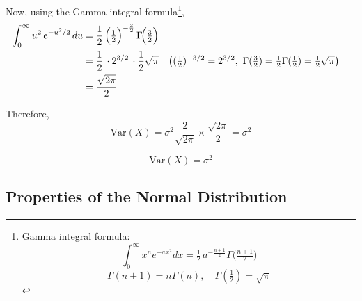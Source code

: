 \documentclass[twoside]{book}
\begin{document}
\begin{itemize}
    Now, using the Gamma integral formula\footnote{Gamma integral formula:
    $$\int_{0}^{\infty} x^n e^{-a x^2}dx
         = \tfrac12\,a^{-\frac{n+1}{2}}\Gamma\!\bigl(\tfrac{n+1}{2}\bigr)$$
         $$\Gamma(n+1) = n\Gamma(n), \quad \Gamma(\tfrac12) = \sqrt{\pi}$$
         },
    \begin{align*}
    \int_{0}^{\infty} u^2\,e^{-u^2/2}\,du
    &= \frac{1}{2}\,\Bigl(\tfrac12\Bigr)^{-\frac{3}{2}}
       \,\Gamma\!\Bigl(\tfrac{3}{2}\Bigr)\\
    &= \frac{1}{2}\,\cdot 2^{3/2}\,\cdot \frac{1}{2}\sqrt{\pi}
    &&\bigl((\tfrac12)^{-3/2}=2^{3/2},\ \Gamma(\tfrac32)=\tfrac12\Gamma(\tfrac12) = \tfrac12\sqrt\pi\bigr)\\
    &= \frac{\sqrt{2\pi}}{2}
    \end{align*}
    
    Therefore,
    \[
    \text{Var}(X) = \sigma^2 \frac{2}{\sqrt{2\pi}} \times \frac{\sqrt{2\pi}}{2}
      = \sigma^2
    \]
    
        \begin{textbox}
        \[
        \text{Var}(X) = \sigma^2
        \]
        \end{textbox}   
\end{itemize}


\subsection{Properties of the Normal Distribution}
\end{document}
